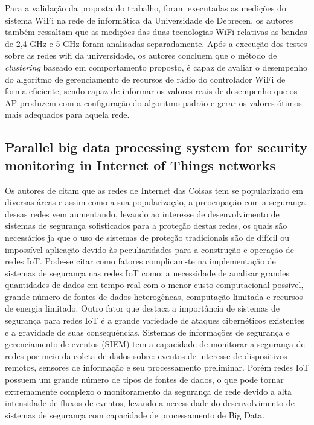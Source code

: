 \documentclass[ti,table]{texufpel} %
\begin{document}
     

     Para a validação da proposta do trabalho, foram executadas as medições do sistema WiFi na rede de informática da Universidade de Debrecen, os autores também ressaltam que as medições das duas tecnologias WiFi relativas as bandas de 2,4 GHz e 5 GHz foram analisadas separadamente. Após a execução dos testes sobre as redes wifi da universidade, os autores concluem que o método de \textit{clustering} baseado em comportamento proposto, é capaz de avaliar o desempenho do algoritmo de gerenciamento de recursos de rádio do controlador WiFi de forma eficiente, sendo capaz de informar os valores reais de desempenho que os AP produzem com a configuração do algoritmo padrão e gerar os valores ótimos mais adequados para aquela rede. 

  

  

  

\subsection{Parallel big data processing system for security monitoring in Internet of Things networks} 

  

  

    Os autores de \cite{art8kotenko2017parallel} citam que as redes de Internet das Coisas tem se popularizado em diversas áreas e assim como a sua popularização, a preocupação com a segurança dessas redes vem aumentando, levando ao interesse de desenvolvimento de sistemas de segurança sofisticados para a proteção destas redes, os quais são necessários ja que o uso de sistemas de proteção tradicionais são de difícil ou impossível aplicação devido às peculiaridades para a construção e operação de redes IoT. Pode-se citar como fatores complicam-te na implementação de sistemas de segurança nas redes IoT como: a necessidade de analisar grandes quantidades de dados em tempo real com o menor custo computacional possível, grande número de fontes de dados heterogêneas, computação limitada e recursos de energia limitado. Outro fator que destaca a importância de sistemas de segurança para redes IoT é a grande variedade de ataques cibernéticos existentes e a gravidade de suas consequências. Sistemas de informações de segurança e gerenciamento de eventos (SIEM) tem a capacidade de monitorar a segurança de redes por meio da coleta de dados sobre: eventos de interesse de dispositivos remotos, sensores de informação e seu processamento preliminar. Porém redes IoT possuem um grande número de tipos de fontes de dados, o que pode tornar extremamente complexo o monitoramento da segurança de rede devido a alta intensidade de fluxos de eventos, levando a necessidade do desenvolvimento de sistemas de segurança com capacidade de processamento de Big Data. 
\end{document}
